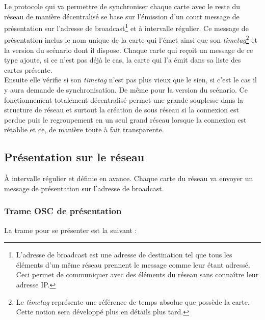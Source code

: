 Le protocole qui va permettre de synchroniser chaque carte avec le reste du réseau de manière décentralisé se base sur l'émission d'un court message de présentation sur l'adresse de broadcast\footnote{L'adresse de broadcast est une adresse de destination tel que tous les éléments d'un même réseau prennent le message comme leur étant adressé. Ceci permet de communiquer avec des éléments du réseau sans connaître leur adresse IP.} et à intervalle régulier.\p
Ce message de présentation inclus le nom unique de la carte qui l'émet ainsi que son \textit{timetag}\footnote{Le \textit{timetag} représente une référence de temps absolue que possède la carte. Cette notion sera développé plus en détails plus tard.} et la version du scénario dont il dispose. Chaque carte qui reçoit un message de ce type ajoute, si ce n'est pas déjà le cas, la carte qui l'a émit dans sa liste des cartes présente.\\
Ensuite elle vérifie si son \textit{timetag} n'est pas plus vieux que le sien, si c'est le cas il y aura demande de synchronisation. De même pour la version du scénario.\p
Ce fonctionnement totalement décentralisé permet une grande souplesse dans la structure de réseau et surtout la création de sous réseau si la connexion est perdue puis le regroupement en un seul grand réseau lorsque la connexion est rétablie et ce, de manière toute à fait transparente.

\subsection{Présentation sur le réseau}

À intervalle régulier et définie en avance. Chaque carte du réseau va envoyer un message de présentation sur l'adresse de broadcast.

\subsubsection{Trame OSC de présentation}

La trame pour se présenter est la suivant :

